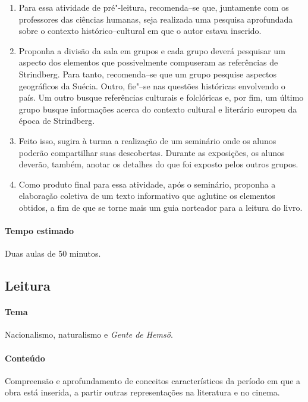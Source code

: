 \documentclass[12pt]{extarticle}
\begin{document}
\begin{enumerate}

\item
Para essa atividade de pré"-leitura, recomenda--se que, juntamente com 
os professores das ciências humanas, seja realizada uma pesquisa 
aprofundada sobre o contexto histórico--cultural
em que o autor estava inserido. 

\item
Proponha a divisão da sala em grupos e cada grupo deverá pesquisar um 
aspecto dos elementos que possivelmente compuseram as referências de 
Strindberg. Para tanto, recomenda--se que um grupo pesquise aspectos 
geográficos da Suécia. Outro, fie"--se nas questões históricas envolvendo 
o país. Um outro busque referências culturais e folclóricas e, por fim, 
um último grupo busque informações acerca do contexto cultural e literário 
europeu da época de Strindberg. 

\item
Feito isso, sugira à turma a realização de um seminário onde os
alunos poderão compartilhar suas descobertas. Durante as exposições, os 
alunos deverão, também, anotar os detalhes do que foi exposto pelos 
outros grupos.

\item
Como produto final para essa atividade, após o seminário, proponha 
a elaboração coletiva de um texto informativo que aglutine os elementos 
obtidos, a fim de que se torne mais um guia norteador para a leitura do 
livro.

\end{enumerate}

\paragraph{Tempo estimado} Duas aulas de 50 minutos.


\subsection{Leitura}

\paragraph{Tema} Nacionalismo, naturalismo e \emph{Gente de Hemsö}.

\paragraph{Conteúdo} Compreensão e aprofundamento de conceitos 
característicos da período em que a obra está inserida, a partir outras representações na literatura e no cinema. 
\end{document}
